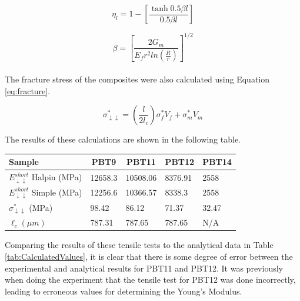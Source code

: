 \documentclass[11pt]{article}
\begin{document}
\begin{equation}
\eta_l = 1- \left[\frac{\tanh 0.5\beta l}{0.5\beta l} \right]
\end{equation}

\begin{equation}
\beta=\left[\frac{2G_m}{E_fr^2 ln(\frac{R}{r})}\right]^{1/2}
\end{equation}
\\
The fracture stress of the composites were also calculated using Equation \ref{eq:fracture}.
 
\begin{equation} \label{eq:fracture}
\sigma^*_{\downarrow \downarrow} = \left( \frac{l}{2l_c}\right) \sigma_f^* V_f + \sigma^*_m V_m
\end{equation}


The results of these calculations are shown in the following table.
\\
\onehalfspacing
\begin{center}
 \label{tab:CalculatedValues}
\begin{tabular}{p{3.5cm} || p{} | p{} | p{} | p{}}
\hline
Sample & \multicolumn{1}{c|}{PBT9} & \multicolumn{1}{c|}{PBT11} & \multicolumn{1}{c|}{PBT12} & \multicolumn{1}{c}{PBT14} \\
\hline
\hline
\(E^{short}_{\downarrow \downarrow}\) Halpin (MPa)& 12658.3 &  10508.06 & 8376.91 & 2558\\
\(E^{short}_{\downarrow \downarrow}\) Simple (MPa)& 12256.6 & 10366.57 & 8338.3 & 2558\\
\(\sigma^*_{\downarrow \downarrow}\) (MPa)& 98.42 & 86.12 & 71.37 & 32.47\\
\(\ell_c (\mu m) \) & 787.31 & 787.65 & 787.65 & N/A\\
\hline
\end{tabular}
\end{center}
\singlespacing

Comparing the results of these tensile tests to the analytical data in Table \ref{tab:CalculatedValues}, it is clear that there is some degree of error between the experimental and analytical results for PBT11 and PBT12. It was previously when doing the experiment that the tensile test for PBT12 was done incorrectly, leading to erroneous values for determining the Young's Modulus.
\end{document}
